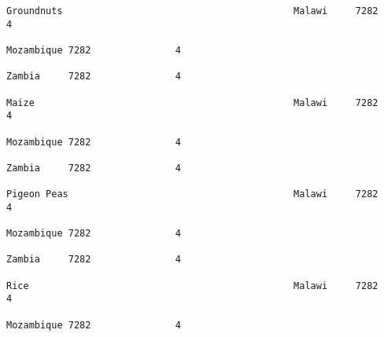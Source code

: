 \documentclass[11pt]{article}
\begin{document}
\begin{Verbatim}[commandchars=\\\{\}]
                                                                                                                                                              Groundnuts                                         Malawi     7282               4  
                                                                                                                                                                                                                 Mozambique 7282               4  
                                                                                                                                                                                                                 Zambia     7282               4  
                                                                                                                                                              Maize                                              Malawi     7282               4  
                                                                                                                                                                                                                 Mozambique 7282               4  
                                                                                                                                                                                                                 Zambia     7282               4  
                                                                                                                                                              Pigeon Peas                                        Malawi     7282               4  
                                                                                                                                                                                                                 Mozambique 7282               4  
                                                                                                                                                                                                                 Zambia     7282               4  
                                                                                                                                                              Rice                                               Malawi     7282               4  
                                                                                                                                                                                                                 Mozambique 7282               4  

\end{Verbatim}
\end{document}
